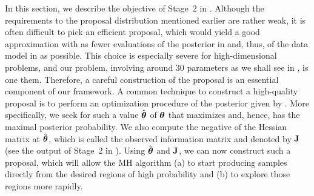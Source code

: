 In this section, we describe the objective of Stage~2 in .
Although the requirements to the proposal distribution mentioned earlier are rather weak, it is often difficult to pick an efficient proposal, which would yield a good approximation with as fewer evaluations of the posterior in  and, thus, of the data model in  as possible.
This choice is especially severe for high-dimensional problems, and our problem, involving around 30 parameters as we shall see in , is one them.
Therefore, a careful construction of the proposal is an essential component of our framework.
A common technique to construct a high-quality proposal is to perform an optimization procedure of the posterior given by .
More specifically, we seek for such a value $\hat{{\boldsymbol\theta}}$ of ${\boldsymbol\theta}$ that maximizes  and, hence, has the maximal posterior probability.
We also compute the negative of the Hessian matrix at $\hat{{\boldsymbol\theta}}$, which is called the observed information matrix and denoted by $\mathbf{J}$ (see the output of Stage~2 in ).
Using $\hat{{\boldsymbol\theta}}$ and $\mathbf{J}$, we can now construct such a proposal, which will allow the MH algorithm (a) to start producing samples directly from the desired regions of high probability and (b) to explore those regions more rapidly.
